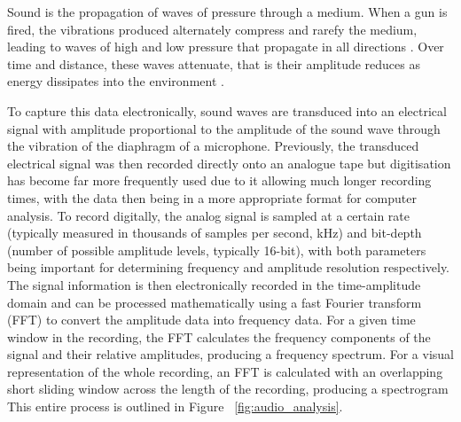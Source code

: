 Sound is the propagation of waves of pressure through a medium. When a gun is fired, the vibrations produced alternately compress and rarefy the medium, leading to waves of high and low pressure that propagate in all directions \citep{Bradbury2011}. Over time and distance, these waves attenuate, that is their amplitude reduces as energy dissipates into the environment \citep{Russ2013}.


To capture this data electronically, sound waves are transduced into an electrical signal with amplitude proportional to the amplitude of the sound wave through the vibration of the diaphragm of a microphone. Previously, the transduced electrical signal was then recorded directly onto an analogue tape but digitisation has become far more frequently used due to it allowing much longer recording times, with the data then being in a more appropriate format for computer analysis. To record digitally, the analog signal is sampled at a certain rate (typically measured in thousands of samples per second, kHz) and bit-depth (number of possible amplitude levels, typically 16-bit), with both parameters being important for determining frequency and amplitude resolution respectively. The signal information is then electronically recorded in the time-amplitude domain and can be processed mathematically using a fast Fourier transform (FFT) to convert the amplitude data into frequency data. For a given time window in the recording, the FFT calculates the frequency components of the signal and their relative amplitudes, producing a frequency spectrum. For a visual representation of the whole recording, an FFT is calculated with an overlapping short sliding window across the length of the recording, producing a spectrogram \citep{TheRoy2003} This entire process is outlined in Figure ~\ref{fig:audio_analysis}.\\

